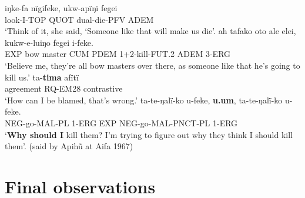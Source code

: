 \documentclass[output=paper]{langsci/langscibook}
\begin{document}
\begin{exe}
\ex \label{ex:eb71}
	\begin{xlist}
	\ex 
	\gll iŋke-fa nïgifeke, ukw-apïŋï fegei\\
	look-I-TOP QUOT dual-die-PFV ADEM\\
	\trans ‘Think of it, she said, ‘Someone like that will make us die’.
	\ex 
	\gll ah tafako oto ale elei, kukw-e-luiŋo fegei i-feke.\\
	EXP bow master CUM PDEM 1+2-kill-FUT.2 ADEM 3-ERG\\
	\trans ‘Believe me, they’re all bow masters over there, as someone like that he’s going to kill us.’
	\ex
	 ta-\textbf{tima} afïtï\\
	agreement RQ-EM28 contrastive\\
	\trans ‘How can I be blamed, that’s wrong.’
	\ex
	\gll ta-te-ŋalï-ko u-feke, \textbf{u.um}, ta-te-ŋalï-ko u-feke.\\
	NEG-go-MAL-PL 1-ERG EXP NEG-go-MAL-PNCT-PL 1-ERG\\
 	\trans ‘\textbf{Why should I} kill them?  I’m trying to figure out why they think I should kill them’. (said by Apihũ at Aifa 1967)
\end{xlist}
\end{exe}


%	



\section{Final observations}\label{s:eb5}
\end{document}
